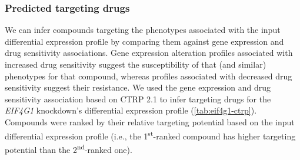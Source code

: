 \subsubsection{Predicted targeting drugs}

We can infer compounds targeting the phenotypes associated with the input differential expression profile by comparing them against gene expression and drug sensitivity associations. Gene expression alteration profiles associated with increased drug sensitivity suggest the susceptibility of that (and similar) phenotypes for that compound, whereas profiles associated with decreased drug sensitivity suggest their resistance. We used the gene expression and drug sensitivity association based on CTRP 2.1 to infer targeting drugs for the \emph{EIF4G1} knockdown's differential expression profile (\autoref{tab:eif4g1-ctrp}). Compounds were ranked by their relative targeting potential based on the input differential expression profile (i.e., the 1\textsuperscript{st}-ranked compound has higher targeting potential than the 2\textsuperscript{nd}-ranked one).


